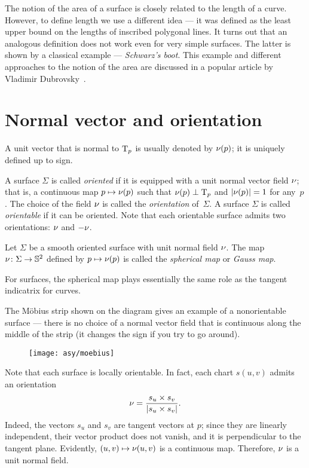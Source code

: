 The notion of the area of a surface is closely related to the length of a curve.
However, to define length we use a different idea --- it was defined as the least upper bound on the lengths of inscribed polygonal lines.
It turns out that an analogous definition does not work even for very simple surfaces.
The latter is shown by a classical example --- \emph{Schwarz's boot}.
This example and different approaches to the notion of the area are discussed in a popular article by Vladimir Dubrovsky~\cite{dubrovsky}.

\section{Normal vector and orientation}
A unit vector that is normal to $\mathrm{T}_p$ is usually denoted by $\nu(p)$;
it is uniquely defined up to sign.

A surface $\Sigma$ is called \emph{oriented} if it is equipped with a unit normal vector field $\nu$;
that is, a continuous map $p\mapsto \nu(p)$ such that $\nu(p)\perp\mathrm{T}_p$ and $|\nu(p)|=1$ for any~$p$.
The choice of the field $\nu$ is called the {}\emph{orientation} of~$\Sigma$.
A surface $\Sigma$ is called {}\emph{orientable} if it can be oriented.
Note that each orientable surface admits two orientations: $\nu$ and $-\nu$.

Let $\Sigma$ be a smooth oriented surface with unit normal field $\nu$.
The map $\nu\colon\Sigma\to \mathbb{S}^2$ defined by $p\mapsto \nu(p)$ is called the \emph{spherical map} or \emph{Gauss map}.

For surfaces, the spherical map plays essentially the same role as the tangent indicatrix for curves.

The Möbius strip shown on the diagram gives an example of a nonorientable surface --- there is no choice of a normal vector field that is continuous along the middle of the strip (it changes the sign if you try to go around).

\begin{wrapfigure}{o}{42 mm}
\vskip-0mm
\centering
\texttt{[image: asy/moebius]}
\vskip0mm
\end{wrapfigure}

Note that each surface is locally orientable.
In fact, each chart $s(u,v)$ admits an orientation 
\[\nu=
\frac{s_u\times s_v}
{\left|s_u\times s_v\right|}.\]
Indeed, the vectors $s_u$ and $s_v$ are tangent vectors at $p$; 
since they are linearly independent, their vector product does not vanish, and it is perpendicular to the tangent plane.
Evidently, $(u,v)\mapsto \nu(u,v)$ is a continuous map.
Therefore, $\nu$ is a unit normal field. 

